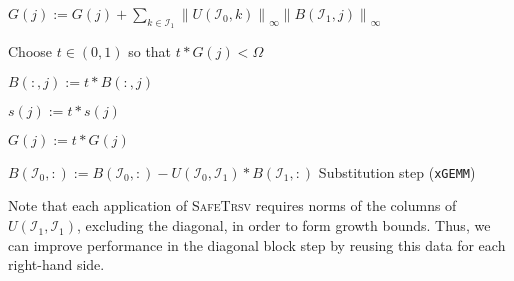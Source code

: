 \documentclass{article}
\begin{document}
\begin{algorithm}[H]
\begin{algorithmic}

    \State \(G(j) := G(j) + \sum_{k\in \mathcal{I}_1} \left\lVert U(\mathcal{I}_0,k) \right\rVert_{\infty} \left\lVert B(\mathcal{I}_1,j) \right\rVert_\infty \)


    \State Choose \(t\in\left(0,1\right)\) so that \(t * G(j) < \Omega\)

    \State \(B(:,j) := t * B(:,j)\)

    \State \(s(j) := t* s(j)\)

    \State \(G(j) := t * G(j)\)    

    \EndIf

    \EndFor

    \State \( B(\mathcal{I}_0,:) := B(\mathcal{I}_0,:) - U(\mathcal{I}_0,\mathcal{I}_1) * B(\mathcal{I}_1,:) \)
    \Comment Substitution step (\texttt{xGEMM})

    \EndFor

    \EndProcedure
  \end{algorithmic}
\end{algorithm}
\noindent
Note that each application of \textsc{SafeTrsv} requires norms of the
columns of \(U(\mathcal{I}_1,\mathcal{I}_1)\), excluding the diagonal,
in order to form growth bounds. Thus, we can improve performance in
the diagonal block step by reusing this data for each right-hand side.
\end{document}
